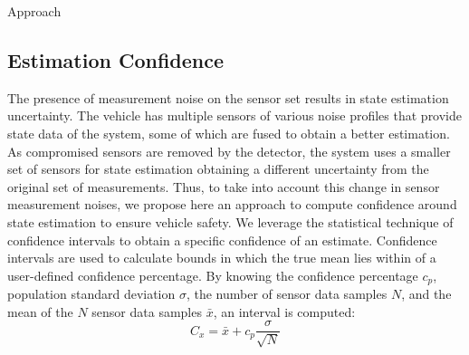 \begin{section}{Approach}

	

\subsection{Estimation Confidence} 

The presence of measurement noise on the sensor set results in state estimation uncertainty. The vehicle has multiple sensors of various noise profiles that provide state data of the system, some of which are fused to obtain a better estimation. As compromised sensors are removed by the detector, the system uses a smaller set of sensors for state estimation obtaining a different uncertainty from the original set of measurements. Thus, to take into account this change in sensor measurement noises, we propose here an approach to compute confidence around state estimation to ensure vehicle safety. 
We leverage the statistical technique of confidence intervals \cite{devore2011probability} to obtain a specific confidence of an estimate. Confidence intervals are used to calculate bounds in which the true mean lies within of a user-defined confidence percentage. By knowing the confidence percentage $c_p$, population standard deviation $\sigma$, the number of sensor data samples $N$, and the mean of the $N$ sensor data samples $\bar{x}$, an interval is computed:
    \begin{equation}
     \label{Confidence_interval}
		C_x = \bar{x} + c_p\frac{\sigma}{\sqrt{N}}
	\end{equation}
	

\end{section}
